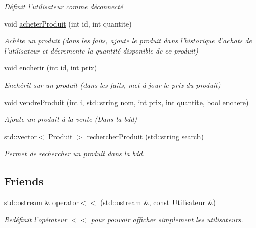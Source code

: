 \begin{DoxyCompactItemize}
\begin{DoxyCompactList}\small\item\em Définit l'utilisateur comme déconnecté \end{DoxyCompactList}\item 
void \hyperlink{classUtilisateur_a8e1e62cea60f42ea9f49ff117ff5cca5}{acheter\-Produit} (int id, int quantite)
\begin{DoxyCompactList}\small\item\em Achète un produit (dans les faits, ajoute le produit dans l'historique d'achats de l'utilisateur et décremente la quantité disponible de ce produit) \end{DoxyCompactList}\item 
void \hyperlink{classUtilisateur_ad54f3dac53d8dc7354bd99bab58a918a}{encherir} (int id, int prix)
\begin{DoxyCompactList}\small\item\em Enchérit sur un produit (dans les faits, met à jour le prix du produit) \end{DoxyCompactList}\item 
void \hyperlink{classUtilisateur_a8eafd96aa8fe49caaaaa7e4c110c574d}{vendre\-Produit} (int i, std\-::string nom, int prix, int quantite, bool enchere)
\begin{DoxyCompactList}\small\item\em Ajoute un produit à la vente (Dans la bdd) \end{DoxyCompactList}\item 
std\-::vector$<$ \hyperlink{classProduit}{Produit} $>$ \hyperlink{classUtilisateur_add6128062f713daa111f1fc7efb055ef}{rechercher\-Produit} (std\-::string search)
\begin{DoxyCompactList}\small\item\em Permet de rechercher un produit dans la bdd. \end{DoxyCompactList}\end{DoxyCompactItemize}
\subsection*{Friends}
\begin{DoxyCompactItemize}
\item 
\hypertarget{classUtilisateur_a6348fd62a39930c3de004f84e1c06fbe}{std\-::ostream \& \hyperlink{classUtilisateur_a6348fd62a39930c3de004f84e1c06fbe}{operator$<$$<$} (std\-::ostream \&, const \hyperlink{classUtilisateur}{Utilisateur} \&)}\label{classUtilisateur_a6348fd62a39930c3de004f84e1c06fbe}

\begin{DoxyCompactList}\small\item\em Redéfinit l'opérateur $<$$<$ pour pouvoir afficher simplement les utilisateurs. \end{DoxyCompactList}\end{DoxyCompactItemize}


